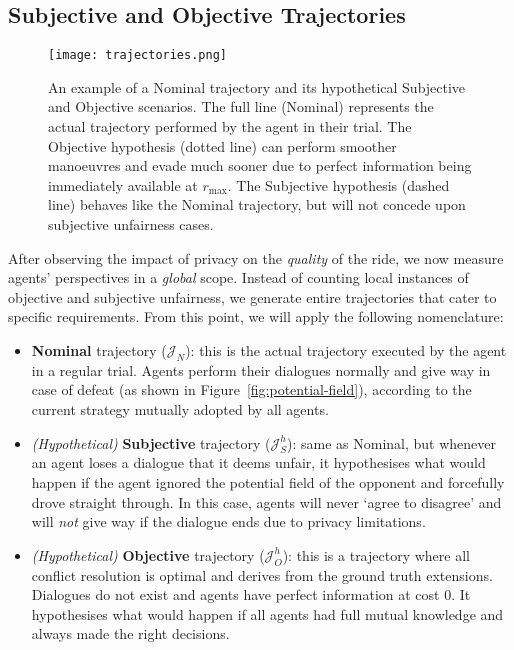 \documentclass[acmsmall]{custom-arxiv}  %
\begin{document}
\subsection{Subjective and Objective Trajectories}

\begin{figure}
\texttt{[image: trajectories.png]}
\caption{An example of a Nominal trajectory and its hypothetical Subjective and Objective scenarios. The full line (Nominal) represents the actual trajectory performed by the agent in their trial. The Objective hypothesis (dotted line) can perform smoother manoeuvres and evade much sooner due to perfect information being immediately available at $r_\text{max}$. The Subjective hypothesis (dashed line) behaves like the Nominal trajectory, but will not concede upon subjective unfairness cases.}
\label{fig:compare-trajec}
\end{figure}

After observing the impact of privacy on the \textit{quality} of the ride, we now measure agents' perspectives in a \textit{global} scope. Instead of counting local instances of objective and subjective unfairness, we generate entire trajectories that cater to specific requirements. From this point, we will apply the following nomenclature:

\begin{itemize}
    \item \textbf{Nominal} trajectory ($\mathcal{J}_N$): this is the actual trajectory executed by the agent in a regular trial. Agents perform their dialogues normally and give way in case of defeat (as shown in Figure~\ref{fig:potential-field}), according to the current strategy mutually adopted by all agents.
    \item \textit{(Hypothetical)} \textbf{Subjective} trajectory ($\mathcal{J}^h_{S}$): same as Nominal, but whenever an agent loses a dialogue that it deems unfair, it hypothesises what would happen if the agent ignored the potential field of the opponent and forcefully drove straight through. In this case, agents will never `agree to disagree' and will \textit{not} give way if the dialogue ends due to privacy limitations.
    \item \textit{(Hypothetical)} \textbf{Objective} trajectory ($\mathcal{J}^h_{O}$): this is a trajectory where all conflict resolution is optimal and derives from the ground truth extensions. Dialogues do not exist and agents have perfect information at cost 0. It hypothesises what would happen if all agents had full mutual knowledge and always made the right decisions.
\end{itemize}
\end{document}
